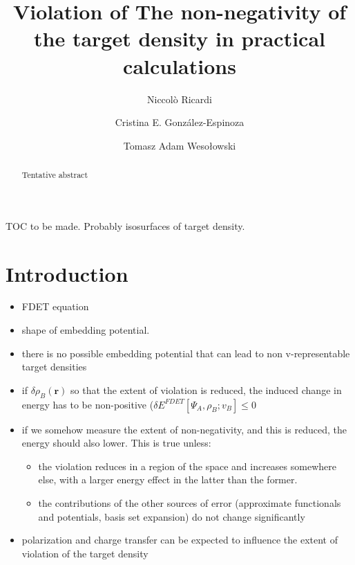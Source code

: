 \documentclass[journal=jctcce,manuscript=article, layout=twocolumn]{achemso}
\author{Niccol\`{o} Ricardi}
\author{Cristina E. Gonz\'{a}lez-Espinoza}
\author{Tomasz Adam Weso\l{}owski}
\affiliation[University of Geneva]
{Department of Physical Chemistry, University of Geneva, Geneva (Switzerland)}
\title[Non-negativity of the target density]
  {Violation of The non-negativity of the target density in practical calculations}
\begin{document}
\begin{tocentry}

TOC to be made. Probably isosurfaces of target density.

\end{tocentry}


\begin{abstract}
Tentative abstract
\end{abstract}

\section{Introduction}
\begin{itemize}
 \item FDET equation
 \item shape of embedding potential.
 \item there is no possible embedding potential that can lead to non v-representable target densities
 \item if $\delta \rho_B (\mathbf{r})$ so that the extent of violation is reduced, the induced change in energy has to be non-positive ($\delta E^{FDET}[\Psi_A,\rho_B; v_B] \leq 0$ 
 \item if we somehow measure the extent of non-negativity, and this is reduced, the energy should also lower. This is true unless:
 \begin{itemize}
  \item the violation reduces in a region of the space and increases somewhere else, with a larger energy effect in the latter than the former.
  \item the contributions of the other sources of error (approximate functionals and potentials, basis set expansion) do not change significantly
 \end{itemize}
 \item polarization and charge transfer can be expected to influence the extent of violation of the target density
\end{itemize}
\end{document}
